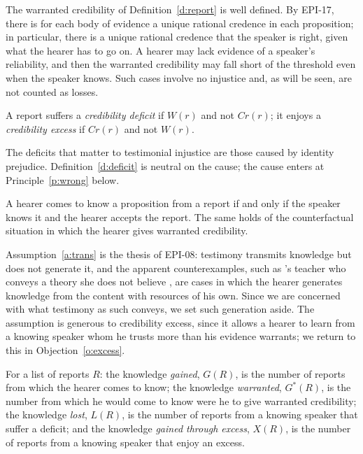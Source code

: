\documentclass{situationist-preprint}
\begin{document}
The warranted credibility of Definition~\ref{d:report} is well defined. By EPI-17, there is for each body of evidence a unique rational credence in each proposition; in particular, there is a unique rational credence that the speaker is right, given what the hearer has to go on. A hearer may lack evidence of a speaker's reliability, and then the warranted credibility may fall short of the threshold even when the speaker knows. Such cases involve no injustice and, as will be seen, are not counted as losses.

\begin{definition}\label{d:deficit}
A report suffers a \emph{credibility deficit} if $W(r)$ and not $\mathit{Cr}(r)$; it enjoys a \emph{credibility excess} if $\mathit{Cr}(r)$ and not $W(r)$.
\end{definition}

The deficits that matter to testimonial injustice are those caused by identity prejudice. Definition~\ref{d:deficit} is neutral on the cause; the cause enters at Principle~\ref{p:wrong} below.

\begin{assumption}[Transmission]\label{a:trans}
A hearer comes to know a proposition from a report if and only if the speaker knows it and the hearer accepts the report. The same holds of the counterfactual situation in which the hearer gives warranted credibility.
\end{assumption}

Assumption~\ref{a:trans} is the thesis of EPI-08: testimony transmits knowledge but does not generate it, and the apparent counterexamples, such as \citeauthor{Lackey2008}'s teacher who conveys a theory she does not believe \citep{Lackey2008}, are cases in which the hearer generates knowledge from the content with resources of his own. Since we are concerned with what testimony as such conveys, we set such generation aside. The assumption is generous to credibility excess, since it allows a hearer to learn from a knowing speaker whom he trusts more than his evidence warrants; we return to this in Objection~\ref{o:excess}.

\begin{definition}[Measures]\label{d:measures}
For a list of reports $R$: the knowledge \emph{gained}, $G(R)$, is the number of reports from which the hearer comes to know; the knowledge \emph{warranted}, $G^{*}(R)$, is the number from which he would come to know were he to give warranted credibility; the knowledge \emph{lost}, $L(R)$, is the number of reports from a knowing speaker that suffer a deficit; and the knowledge \emph{gained through excess}, $X(R)$, is the number of reports from a knowing speaker that enjoy an excess.
\end{definition}
\end{document}
